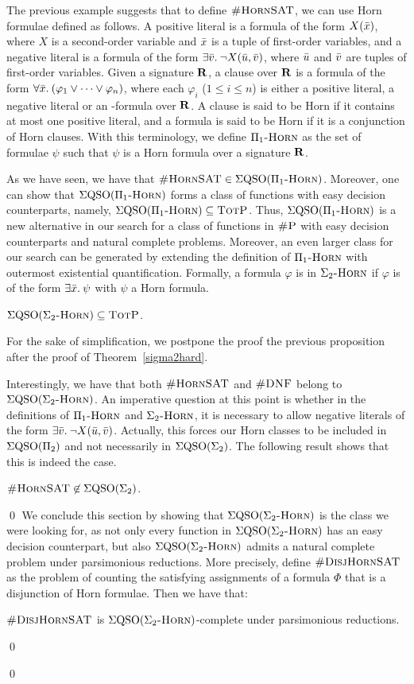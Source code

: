 The previous example suggests that to define $\textsc{\#HornSAT}$, we can use Horn formulae defined as follows. 
A positive literal is a formula of the form $X(\bar{x})$, where $X$ is a second-order variable and $\bar{x}$ is a tuple of first-order variables, and a negative literal is a formula of the form $\exists{\bar{v}}.\: \neg X(\bar{u},\bar{v})$, where $\bar{u}$ and $\bar{v}$ are tuples of first-order variables. Given a signature $\mathbf{R}$, a clause over $\mathbf{R}$ is a formula of the form $\forall{\bar{x}}.\: (\varphi_1 \vee \cdots \vee \varphi_n)$, 
where each $\varphi_i$ ($1 \leq i \leq n$) is either a positive literal, a negative literal or an \fo-formula over $\mathbf{R}$.  A clause is said to be Horn if it contains at most one positive literal, and a formula is said to be Horn if it is a conjunction of Horn clauses. With this terminology, we define $\Pi_1\textsc{-Horn}$ as the set of formulae $\psi$ such that $\psi$ is a Horn formula over a signature $\mathbf{R}$. 

As we have seen, we have that $\textsc{\#HornSAT} \in \Sigma{\rm QSO}(\Pi_1\textsc{-Horn})$. Moreover, one can show that $\Sigma{\rm QSO}(\Pi_1\textsc{-Horn})$ forms a class of functions with easy decision counterparts, namely, $\Sigma{\rm QSO}(\Pi_1\textsc{-Horn}) \subseteq \text{\sc TotP}$.
Thus, $\Sigma{\rm QSO}(\Pi_1\textsc{-Horn})$ is a new alternative in our search for a class of functions in $\text{\sc \#P}$ with easy decision counterparts and natural complete problems. Moreover, an even larger class for our search can be generated by extending the definition of $\Pi_1\textsc{-Horn}$ with outermost existential quantification. 
Formally, a formula $\varphi$ is in $\Sigma_2\textsc{-Horn}$ if $\varphi$ is of the form $\exists{\bar x}.\: \psi$ with $\psi$ a Horn formula. 

\begin{prop}\label{prop:ehorn-pe}
$\Sigma{\rm QSO}(\Sigma_2\textsc{-Horn}) \subseteq \text{\sc TotP}$.
\end{prop}
For the sake of simplification, we postpone the proof the previous proposition after the proof of Theorem~\ref{sigma2hard}.

Interestingly, we have that both $\textsc{\#HornSAT}$ and $\textsc{\#DNF}$ belong to $\Sigma{\rm QSO}(\Sigma_2\textsc{-Horn})$. 
An imperative question at this point is whether in the definitions of $\Pi_1\textsc{-Horn}$ and $\Sigma_2\textsc{-Horn}$, it is necessary to allow negative literals of the form $\exists{\bar{v}}.\: \neg X(\bar{u},\bar{v})$. Actually, this forces our Horn classes to be included in $\Sigma{\rm QSO}(\Pi_{2})$ and not necessarily in $\Sigma{\rm QSO}(\Sigma_{2})$. The following result shows that this is indeed the case.

\begin{prop}\label{prop:hsat-not-sigma2}	
$\textsc{\#HornSAT} \not\in \Sigma{\rm QSO}(\Sigma_{2})$.
\end{prop}
\proof

\qed
We conclude this section by showing that $\Sigma{\rm QSO}(\Sigma_2\textsc{-Horn})$ is the class we were looking for, as not only every function in $\Sigma{\rm QSO}(\Sigma_2\textsc{-Horn})$ has an easy decision counterpart, but also $\Sigma{\rm QSO}(\Sigma_2\textsc{-Horn})$ admits a natural complete problem under parsimonious reductions. More precisely, define 
$\textsc{\#DisjHornSAT}$ as the problem of counting the satisfying assignments of a formula $\Phi$ that is a disjunction of Horn formulae. Then we have that:

\begin{thm} \label{sigma2hard}
	$\textsc{\#DisjHornSAT}$ is $\Sigma{\rm QSO}(\Sigma_2\textsc{-Horn})$-complete under parsimonious reductions. 
\end{thm}
\proof

\qed


\qed